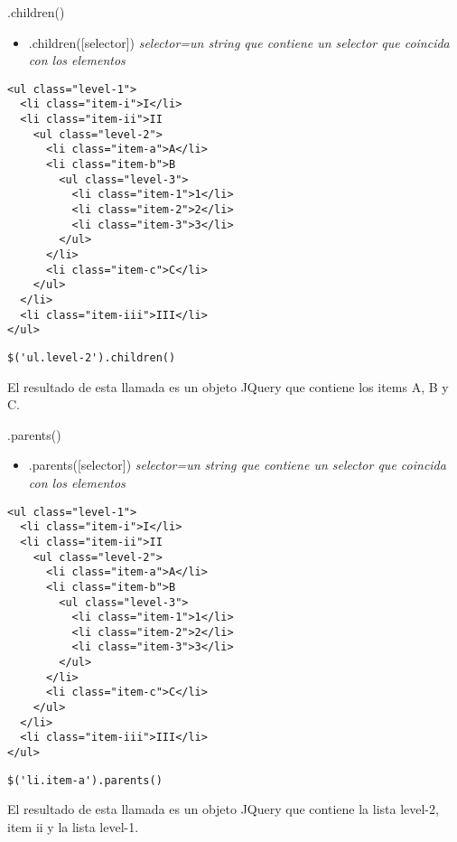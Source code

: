 \begin{frame}[fragile]{.children()} %
\begin{itemize}
    \item .children([selector]) \textit{ selector=un string que contiene un selector que coincida con los elementos }
\end{itemize}
\begin{lstlisting}
<ul class="level-1">
  <li class="item-i">I</li>
  <li class="item-ii">II
    <ul class="level-2">
      <li class="item-a">A</li>
      <li class="item-b">B
        <ul class="level-3">
          <li class="item-1">1</li>
          <li class="item-2">2</li>
          <li class="item-3">3</li>
        </ul>
      </li>
      <li class="item-c">C</li>
    </ul>
  </li>
  <li class="item-iii">III</li>
</ul>
\end{lstlisting}
\begin{lstlisting}
$('ul.level-2').children()
\end{lstlisting}
El resultado de esta llamada es un objeto JQuery que contiene los items A, B y C. \\[0.9cm]
\end{frame}

\begin{frame}[fragile]{.parents()} %
\begin{itemize}
    \item .parents([selector]) \textit{ selector=un string que contiene un selector que coincida con los elementos }
\end{itemize}
\begin{lstlisting}
<ul class="level-1">
  <li class="item-i">I</li>
  <li class="item-ii">II
    <ul class="level-2">
      <li class="item-a">A</li>
      <li class="item-b">B
        <ul class="level-3">
          <li class="item-1">1</li>
          <li class="item-2">2</li>
          <li class="item-3">3</li>
        </ul>
      </li>
      <li class="item-c">C</li>
    </ul>
  </li>
  <li class="item-iii">III</li>
</ul>
\end{lstlisting}
\begin{lstlisting}
$('li.item-a').parents()
\end{lstlisting}
El resultado de esta llamada es un objeto JQuery que contiene la lista level-2, item ii y la lista level-1.\\[0.9cm]
\end{frame}

